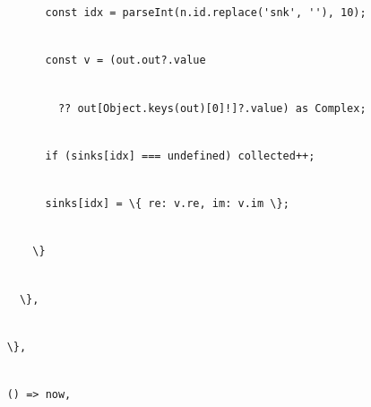 \documentclass[
]{article}
\newcommand{\passthrough}[1]{#1}
\begin{document}
\passthrough{\lstinline!          !}\passthrough{\lstinline!const!}\passthrough{\lstinline! !}\passthrough{\lstinline!idx!}\passthrough{\lstinline! !}\passthrough{\lstinline!=!}\passthrough{\lstinline! !}\passthrough{\lstinline!parseInt!}\passthrough{\lstinline!(!}\passthrough{\lstinline!n.id.replace!}\passthrough{\lstinline!('!}\passthrough{\lstinline!snk!}\passthrough{\lstinline!',!}\passthrough{\lstinline! !}\passthrough{\lstinline!''),!}\passthrough{\lstinline! !}\passthrough{\lstinline!10);!}\strut \\
\passthrough{\lstinline!          !}\passthrough{\lstinline!const!}\passthrough{\lstinline! !}\passthrough{\lstinline!v!}\passthrough{\lstinline! !}\passthrough{\lstinline!=!}\passthrough{\lstinline! !}\passthrough{\lstinline!(!}\passthrough{\lstinline!out.out?.value!}\strut \\
\passthrough{\lstinline!            !}\passthrough{\lstinline!??!}\passthrough{\lstinline! !}\passthrough{\lstinline!out[!}\passthrough{\lstinline!Object.keys!}\passthrough{\lstinline"(out)[0]!]?.value)"}\passthrough{\lstinline! !}\passthrough{\lstinline!as!}\passthrough{\lstinline! !}\passthrough{\lstinline!Complex;!}\strut \\
\passthrough{\lstinline!          !}\passthrough{\lstinline!if!}\passthrough{\lstinline! !}\passthrough{\lstinline!(sinks[!}\passthrough{\lstinline!idx!}\passthrough{\lstinline!]!}\passthrough{\lstinline! !}\passthrough{\lstinline!===!}\passthrough{\lstinline! !}\passthrough{\lstinline!undefined)!}\passthrough{\lstinline! !}\passthrough{\lstinline!collected++;!}\strut \\
\passthrough{\lstinline!          !}\passthrough{\lstinline!sinks[!}\passthrough{\lstinline!idx!}\passthrough{\lstinline!]!}\passthrough{\lstinline! !}\passthrough{\lstinline!=!}\passthrough{\lstinline! !}\passthrough{\lstinline!\{!}\passthrough{\lstinline! !}\passthrough{\lstinline!re:!}\passthrough{\lstinline! !}\passthrough{\lstinline!v.re,!}\passthrough{\lstinline! !}\passthrough{\lstinline!im:!}\passthrough{\lstinline! !}\passthrough{\lstinline!v.im!}\passthrough{\lstinline! !}\passthrough{\lstinline!\};!}\strut \\
\passthrough{\lstinline!        !}\passthrough{\lstinline!\}!}\strut \\
\passthrough{\lstinline!      !}\passthrough{\lstinline!\},!}\strut \\
\passthrough{\lstinline!    !}\passthrough{\lstinline!\},!}\strut \\
\passthrough{\lstinline!    !}\passthrough{\lstinline!()!}\passthrough{\lstinline! !}\passthrough{\lstinline!=>!}\passthrough{\lstinline! !}\passthrough{\lstinline!now,!}\strut \\
\end{document}
